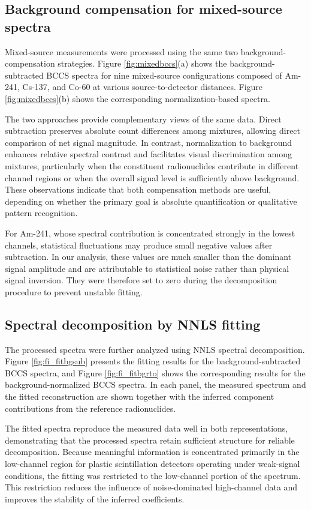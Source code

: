 \documentclass[fleqn, 10pt]{wlscirep}
\begin{document}
\subsection*{Background compensation for mixed-source spectra}

Mixed-source measurements were processed using the same two background-compensation strategies. Figure \ref{fig:mixedbccs}(a) shows the background-subtracted BCCS spectra for nine mixed-source configurations composed of Am-241, Cs-137, and Co-60 at various source-to-detector distances. Figure \ref{fig:mixedbccs}(b) shows the corresponding normalization-based spectra.

The two approaches provide complementary views of the same data. Direct subtraction preserves absolute count differences among mixtures, allowing direct comparison of net signal magnitude. In contrast, normalization to background enhances relative spectral contrast and facilitates visual discrimination among mixtures, particularly when the constituent radionuclides contribute in different channel regions or when the overall signal level is sufficiently above background. These observations indicate that both compensation methods are useful, depending on whether the primary goal is absolute quantification or qualitative pattern recognition.

For Am-241, whose spectral contribution is concentrated strongly in the lowest channels, statistical fluctuations may produce small negative values after subtraction. In our analysis, these values are much smaller than the dominant signal amplitude and are attributable to statistical noise rather than physical signal inversion. They were therefore set to zero during the decomposition procedure to prevent unstable fitting.


\subsection*{Spectral decomposition by NNLS fitting}

The processed spectra were further analyzed using NNLS spectral decomposition. Figure \ref{fig:fi_fitbgsub} presents the fitting results for the background-subtracted BCCS spectra, and Figure \ref{fig:fi_fitbgrto} shows the corresponding results for the background-normalized BCCS
spectra. In each panel, the measured spectrum and the fitted reconstruction are shown together with the inferred component contributions from the reference radionuclides.

The fitted spectra reproduce the measured data well in both representations, demonstrating that the processed spectra retain sufficient structure for reliable decomposition. Because meaningful information is concentrated primarily in the low-channel region for plastic scintillation detectors operating under weak-signal conditions, the fitting was restricted to the low-channel portion of the spectrum. This restriction reduces the influence of noise-dominated high-channel data and improves the stability of the inferred coefficients.
\end{document}
